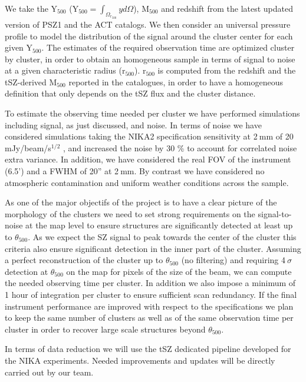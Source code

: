 \documentclass[11pt,a4paper,twoside,graphicx,color]{article}
\begin{document}
We take the Y$_{500}$ (Y$_{500} =  \int_{\Omega_{r_{500}}}y d\Omega$), M$_{500}$ and redshift from the latest updated version of PSZ1 and the ACT catalogs. We then consider an universal pressure profile \citep{Arnaud2010} to model the distribution of the signal around the cluster center for each given Y$_{500}$. The estimates of the required observation time are optimized cluster by cluster, in order to obtain an homogeneous sample in terms of signal to noise at a given characteristic radius (r$_{500}$). r$_{500}$ is computed from the redshift and the tSZ-derived M$_{500}$ reported in the catalogues, in order to have a homogeneous definition that only depends on the tSZ flux and the cluster distance.

To estimate the observing time needed per cluster we have performed simulations including signal, as just discussed, and noise. In terms of noise we have considered simulations taking the NIKA2 specification sensitivity at 2$~$mm of 20 mJy/beam/s$^{1/2}$
, and increased the noise by 30 \% to account for correlated noise extra variance. In addition, we have considered the real FOV of the instrument (6.5') and a FWHM of 20'' at 2$~$mm. By contrast we have considered no atmospheric contamination and uniform weather conditions across the sample. 

As one of the major objectifs of the project is to have a clear picture of the morphology of the clusters we need to set strong requirements on the signal-to-noise at the map level to ensure structures
are significantly detected at least up to $\theta_{500}$. As we expect the SZ signal to peak towards the center of the cluster this criteria also ensure significant detection in the inner part of the cluster.
Assuming a perfect reconstruction of the cluster up to $\theta_{500}$ (no filtering) and requiring 4$~\sigma$ detection at $\theta_{500}$ on the map for pixels of the size of the beam, we can compute the needed observing time per cluster.  In addition we also impose a minimum of 1 hour of integration per cluster to ensure sufficient  scan redundancy.  If the final instrument performance are improved with respect to the specifications we plan to keep the same number of clusters as well as of the same observation time per cluster in order to recover large scale structures beyond $\theta_{500}$.

In terms of data reduction we will use the tSZ dedicated pipeline developed for the NIKA experiments. Needed improvements and updates will be directly carried out by our team.
\end{document}
